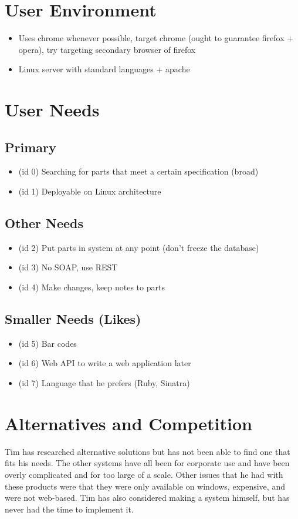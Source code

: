 \documentclass{article}
\begin{document}
\section{User Environment}
\begin{itemize}
\item Uses chrome whenever possible, target chrome (ought to guarantee firefox + opera), try targeting secondary browser of firefox
\item Linux server with standard languages + apache
\end{itemize}

\section{User Needs}
\subsection{Primary}
\begin{itemize}
\item (id 0) Searching for parts that meet a certain specification (broad)
\item (id 1) Deployable on Linux architecture
\end{itemize}
\subsection{Other Needs}
\begin{itemize}
\item (id 2) Put parts in system at any point (don't freeze the database)
\item (id 3) No SOAP, use REST
\item (id 4) Make changes, keep notes to parts
\end{itemize}
\subsection{Smaller Needs (Likes)}
\begin{itemize}
\item (id 5) Bar codes
\item (id 6) Web API to write a web application later
\item (id 7) Language that he prefers (Ruby, Sinatra)
\end{itemize}


\section{Alternatives and Competition}
Tim has researched alternative solutions but has not been able to find one that fits his needs.  The other systems have all been for corporate use and have been overly complicated and for too large of a scale.  Other issues that he had with these products were that they were only available on windows, expensive, and were not web-based.  Tim has also considered making a system himself, but has never had the time to implement it.
\end{document}
